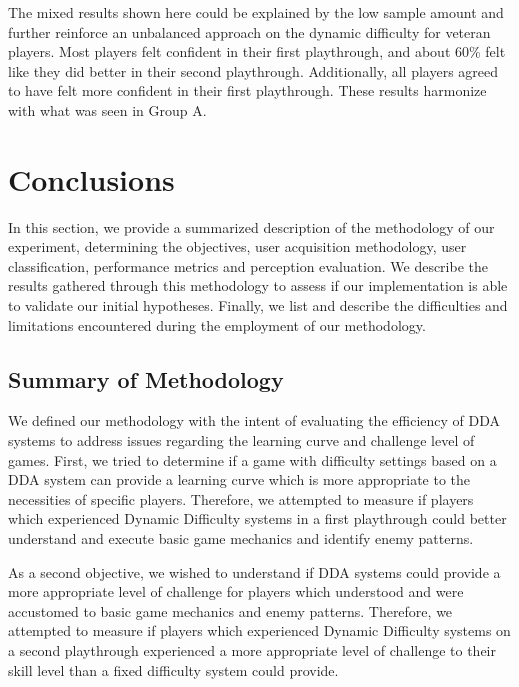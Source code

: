 The mixed results shown here could be explained by the low sample amount and further reinforce an unbalanced approach on the dynamic difficulty for veteran players. Most players felt confident in their first playthrough, and about 60\% felt like they did better in their second playthrough. Additionally, all players agreed to have felt more confident in their first playthrough. These results harmonize with what was seen in Group A.


\section{Conclusions}

In this section, we provide a summarized description of the methodology of our experiment, determining the objectives, user acquisition methodology, user classification, performance metrics and perception evaluation. We describe the results gathered through this methodology to assess if our implementation is able to validate our initial hypotheses. Finally, we list and describe the difficulties and limitations encountered during the employment of our methodology.

\subsection{Summary of Methodology}

We defined our methodology with the intent of evaluating the efficiency of DDA systems to address issues regarding the learning curve and challenge level of games. First, we tried to determine if a game with difficulty settings based on a DDA system can provide a learning curve which is more appropriate to the necessities of specific players. Therefore, we attempted to measure if players which experienced Dynamic Difficulty systems in a first playthrough could better understand and execute basic game mechanics and identify enemy patterns.

As a second objective, we wished to understand if DDA systems could provide a more appropriate level of challenge for players which understood and were accustomed to basic game mechanics and enemy patterns.  Therefore, we attempted to measure if players which experienced Dynamic Difficulty systems on a second playthrough experienced a more appropriate level of challenge to their skill level than a fixed difficulty system could provide.

